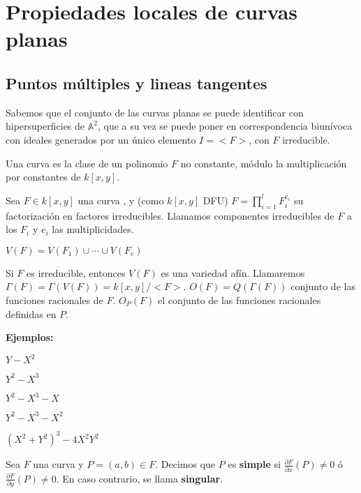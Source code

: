 \chapter{Propiedades locales de curvas planas}

\section{Puntos múltiples y lineas tangentes}

Sabemos que el conjunto de las curvas planas se puede identificar con hipersuperficies de $\mathbb{A}^2$, que a su vez se puede poner en correspondencia biunívoca con ideales generados por un único elemento $I=<F>$, con $F$ irreducible.

\begin{Def}
Una curva es la clase de un polinomio $F$ no constante, módulo la multiplicación por constantes de $k[x,y]$. 
\end{Def}

\begin{Def}
Sea $F\in k[x,y]$ una curva , y (como $k[x,y]$ DFU) $F=\prod_{i=1}^l F_i^{e_i}$ su factorización en factores irreducibles. Llamamos componentes irreducibles de $F$ a los $F_i$ y $e_i$ las multiplicidades. 
\end{Def}

\begin{nota}
$V(F)=V(F_1)\cup \cdots \cup V(F_e)$
\end{nota}

\begin{nota}
Si $F$ es irreducible, entonces $V(F)$ es una variedad afín. Llamaremos $\Gamma(F)=\Gamma(V(F))=k[x,y]/<F>$. $O(F)=Q(\Gamma(F))$ conjunto de las funciones racionales de $F$. $O_P(F)$ el conjunto de las funciones racionales definidas en $P$. 
\end{nota}


\textbf{Ejemplos:}

\begin{itemize*}
\item $Y-X^2$
\item $Y^2-X^3$
\item $Y^2-X^3-X$
\item $Y^2-X^3-X^2$
\item $(X^2+Y^2)^3-4X^2Y^2$
\end{itemize*}

\begin{Def}
Sea $F$ una curva y $P=(a,b)\in F$. Decimos que $P$ es \textbf{simple} si $\frac{\partial F}{\partial x}(P) \neq 0$ ó $\frac{\partial F}{\partial y}(P) \neq 0$. En caso contrario, se llama \textbf{singular}. 
\end{Def}

